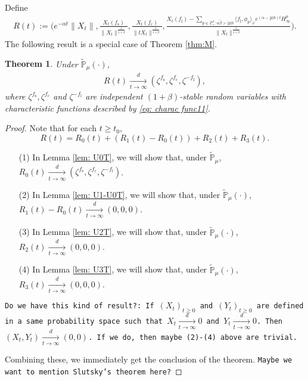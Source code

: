\documentclass[12pt,a4paper]{amsart}
\theoremstyle{plain}
\newtheorem{thm}{Theorem}[section]
\theoremstyle{definition}
\numberwithin{equation}{section}
\begin{document}
Define
\begin{align}
R(t):=\Bigg(e^{-\alpha t}\|X_t\|, \frac{X_t(f_\mathrm s)}{\|X_t\|^{\frac{1}{1+\beta}}},\frac{X_t(f_\mathrm c)}{\|tX_t\|^{\frac{1}{1+\beta}}},\frac{ X_t(f_\mathrm l) - \sum_{p\in \mathbb Z^d_+:\alpha \tilde \beta>|p|b}\langle f_\mathrm l,\phi_p\rangle_\varphi e^{(\alpha-|p|b)t}H^p_{\infty}}{\|X_t\|^{\frac{1}{1+\beta}}}\Bigg).
\end{align}
The following result is a special case of Theorem \ref{thm:M}.
\begin{thm}\label{thm: II}
Under $\mathbb{\widetilde{P}}_{\mu}(\cdot)$,
\begin{align}
R(t) \xrightarrow[t\rightarrow\infty]{d}(\zeta^{f_\mathrm s},\zeta^{f_\mathrm c},\zeta^{-f_\mathrm l}),
\end{align}
where $\zeta^{f_\mathrm s},\zeta^{f_\mathrm c}$ and $\zeta^{-f_\mathrm l}$ are independent $(1+\beta)$-stable random variables with characteristic functions described by \eqref{eq: charac func11}.
\end{thm}
\begin{proof}

Note that for each $t\geq t_0$,
\[
R(t)=R_0(t)+(R_1(t)-R_0(t))+R_2(t)+R_3(t).
\]

\begin{itemize}
\item[(1)] In Lemma \ref{lem: U0T}, we will show that, under $\mathbb{\widetilde{P}}_{\mu}$, $R_0(t) \xrightarrow[t\to \infty]{d}(\zeta^{f_\mathrm s},\zeta^{f_\mathrm c},\zeta^{-f_\mathrm l})$.
\item[(2)] In Lemma \ref{lem: U1-U0T}, we will show that, under $\mathbb{\widetilde{P}}_{\mu}(\cdot)$, $R_1(t)-R_0(t)\xrightarrow[t\to \infty]{d} (0,0,0)$.
\item[(3)] In Lemma \ref{lem: U2T}, we will show that, under $\mathbb{\widetilde{P}}_{\mu}(\cdot)$, $R_2(t)\xrightarrow[t\to \infty]{d}(0,0,0)$.
\item[(4)] In Lemma \ref{lem: U3T}, we will show that, under $\mathbb{\widetilde{P}}_{\mu}(\cdot)$, $R_3(t)\xrightarrow[t\to \infty]{d}(0,0,0)$.
\end{itemize}

{\color{blue}\tt Do we have this kind of result?: If $(X_t)_{t\geq 0}$ and $(Y_t)_{t\geq 0}$ are defined in a same probability space such that $X_t\xrightarrow[t\to \infty]{d}0$ and $Y_t\xrightarrow[t\to \infty]{d} 0$. Then $(X_t,Y_t) \xrightarrow[t\to \infty]{d} (0,0)$. If we do, then maybe (2)-(4) above are trivial.}

Combining these, we immediately get the conclusion of the theorem. {\color{blue}\tt Maybe we want to mention Slutsky's theorem here?}
\end{proof}
\end{document}
